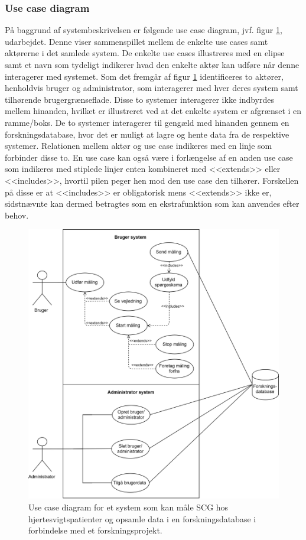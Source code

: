 \subsubsection{Use case diagram}
På baggrund af systembeskrivelsen er følgende use case diagram, jvf. figur \ref{fig:usecase}, udarbejdet. Denne viser sammenspillet mellem de enkelte use cases samt aktørerne i det samlede system. De enkelte use cases illustreres med en elipse samt et navn som tydeligt indikerer hvad den enkelte aktør kan udføre når denne interagerer med systemet. Som det fremgår af figur \ref{fig:usecase} identificeres to aktører, henholdvis bruger og administrator, som interagerer med hver deres system samt tilhørende brugergrænseflade. Disse to systemer interagerer ikke indbyrdes mellem hinanden, hvilket er illustreret ved at det enkelte system er afgrænset i en ramme/boks. De to systemer interagerer til gengæld med hinanden gennem en forskningsdatabase, hvor det er muligt at lagre og hente data fra de respektive systemer. Relationen mellem aktør og use case indikeres med en linje som forbinder disse to. En use case kan også være i forlængelse af en anden use case som indikeres med stiplede linjer enten kombineret med <<extends>> eller <<includes>>, hvortil pilen peger hen mod den use case den tilhører. Forskellen på disse er at <<includes>> er obligatorisk mens <<extends>> ikke er, sidstnævnte kan dermed betragtes som en ekstrafunktion som kan anvendes efter behov.      

\begin{figure}[H]
\centering
  \includegraphics[width=1\textwidth]{Billeder/Usecase.png}
   \caption{Use case diagram for et system som kan måle SCG hos hjertesvigtspatienter og opsamle data i en forskningsdatabase i forbindelse med et forskningsprojekt. } 
   \label{fig:usecase}
\end{figure}

